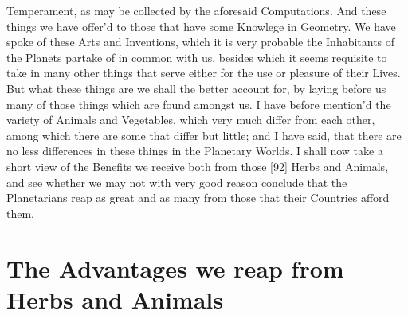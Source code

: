 \documentclass[letterpaper]{book}
\begin{document}
Temperament, as may be collected by the aforesaid Computations. And these
things we have offer'd to those that have some Knowlege in Geometry.  We
have spoke of these Arts and Inventions, which it is very probable the
Inhabitants of the Planets partake of in common with us, besides which it
seems requisite to take in many other things that serve either for the use
or pleasure of their Lives. But what these things are we shall the better
account for, by laying before us many of those things which are found
amongst us.  I have before mention'd the variety of Animals and Vegetables,
which very much differ from each other, among which there are some that
differ but little; and I have said, that there are no less differences in
these things in the Planetary Worlds.  I shall now take a short view of the
Benefits we receive both from those [92] Herbs and Animals, and see whether
we may not with very good reason conclude that the Planetarians reap as
great and as many from those that their Countries afford them.


\section{The Advantages we reap from Herbs and Animals}
\end{document}
